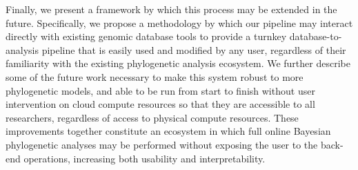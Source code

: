 Finally, we present a framework by which this process may be extended in the future.
Specifically, we propose a methodology by which our pipeline may interact directly with existing genomic database tools to provide a turnkey database-to-analysis pipeline that is easily used and modified by any user, regardless of their familiarity with the existing phylogenetic analysis ecosystem.
We further describe some of the future work necessary to make this system robust to more phylogenetic models, and able to be run from start to finish without user intervention on cloud compute resources so that they are accessible to all researchers, regardless of access to physical compute resources.
These improvements together constitute an ecosystem in which full online Bayesian phylogenetic analyses may be performed without exposing the user to the back-end operations, increasing both usability and interpretability.

%


\cleardoublepage

